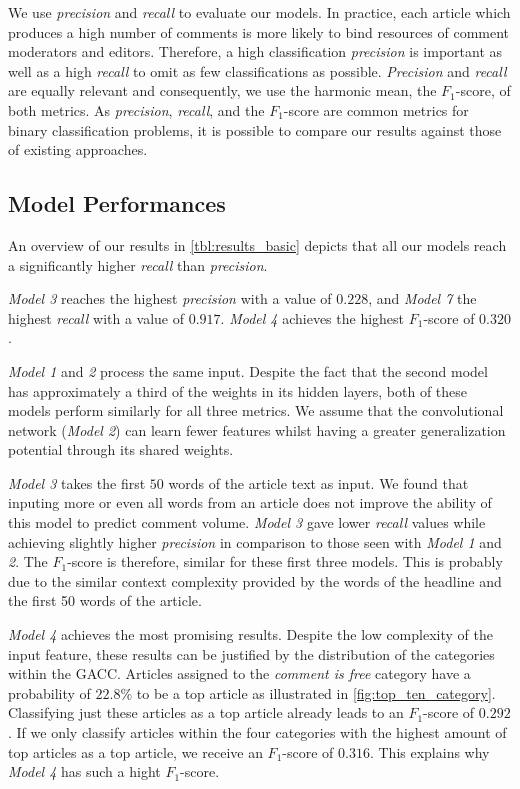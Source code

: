 We use \textit{precision} and \textit{recall} to evaluate our models. 
In practice, each article which produces a high number of comments is more likely to bind resources of comment moderators and editors.
Therefore, a high classification \textit{precision} is important as well as a high \textit{recall} to omit as few classifications as possible.
\textit{Precision} and \textit{recall} are equally relevant and consequently, we use the harmonic mean, the $F_1$-score, of both metrics. As \textit{precision}, \textit{recall}, and the $F_1$-score are common metrics for binary classification problems, it is possible to compare our results against those of existing approaches.

\subsection{Model Performances}
An overview of our results in \autoref{tbl:results_basic} depicts that all our models reach a significantly higher \textit{recall} than \textit{precision}.

\textit{Model 3} reaches the highest \textit{precision} with a value of $0.228$, and \textit{Model 7} the highest \textit{recall} with a value of $0.917$. \textit{Model 4} achieves the highest $F_1$-score of $0.320$. 



\textit{Model 1} and \textit{2} process the same input. Despite the fact that the second model has approximately a third of the weights in its hidden layers, both of these models perform similarly for all three metrics.
We assume that the convolutional network (\textit{Model 2}) can learn fewer features whilst having a greater generalization potential through its shared weights.

\textit{Model 3} takes the first $50$ words of the article text as input. 
We found that inputing more or even all words from an article does not improve the ability of this model to predict comment volume.
\textit{Model 3} gave lower \textit{recall} values while achieving slightly higher \textit{precision} in comparison to those seen with \textit{Model 1} and \textit{2}. 
The $F_1$-score is therefore, similar for these first three models.
This is probably due to the similar context complexity provided by the words of the headline and the first 50 words of the article.

\textit{Model 4} achieves the most promising results. 
Despite the low complexity of the input feature, these results can be justified by the distribution of the categories within the GACC. 
Articles assigned to the \textit{comment is free} category have a probability of $22.8\%$ to be a top article as illustrated in \autoref{fig:top_ten_category}. 
Classifying just these articles as a top article already leads to an $F_1$-score of $0.292$.
If we only classify articles within the four categories with the highest amount of top articles as a top article, we receive an $F_1$-score of $0.316$. 
This explains why \textit{Model 4} has such a hight $F_1$-score.

